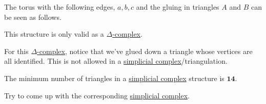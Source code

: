 \begin{eg}
	The torus with the following edges, \(a, b, c\) and the gluing in triangles \(A\) and \(B\) can be seen as follows.
	\begin{figure}[H]
		\centering
		\label{fig:eg:constructing-torus-simplicial}
	\end{figure}
	This structure is only valid as a \hyperref[def:delta-complex]{\(\Delta\)-complex}.
\end{eg}
\begin{explanation}
	For this \hyperref[def:delta-complex]{\(\Delta \)-complex}, notice that we've glued down a triangle whose vertices are all identified. This is not allowed in a \hyperref[def:simplicial-complex]{simplicial complex}/triangulation.

	\begin{remark}
		The minimum number of triangles in a \hyperref[def:simplicial-complex]{simplicial complex} structure is \(\bm{14}\).
		\begin{exercise}
			Try to come up with the corresponding \hyperref[def:simplicial-complex]{simplicial complex}.
		\end{exercise}
	\end{remark}
\end{explanation}